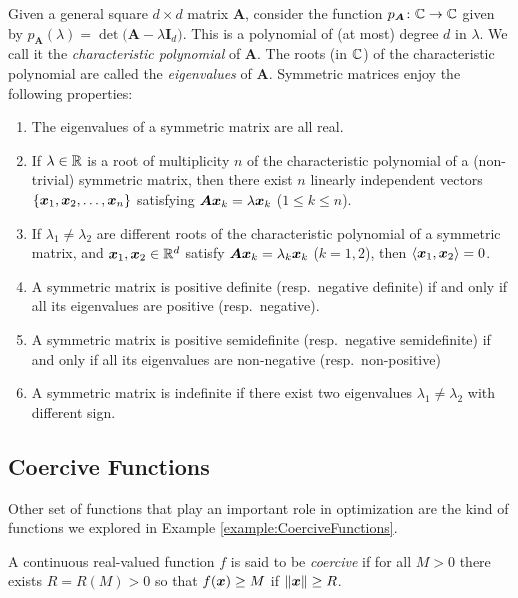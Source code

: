 \begin{theorem}\label{theorem:eigenvalues}
Given a general square $d \times d$ matrix $\boldsymbol{A}$, consider the function $p_{\boldsymbol{A}} \colon \mathbb{C} \to \mathbb{C}$ given by $p_{\boldsymbol{A}}(\lambda) = \det\big(\boldsymbol{A} - \lambda \boldsymbol{I}_d \big)$.  This is a polynomial of (at most) degree $d$ in $\lambda$.  We call it the \emph{characteristic polynomial} of $\boldsymbol{A}$.  The roots (in $\mathbb{C}$) of the characteristic polynomial are called the \emph{eigenvalues} of $\boldsymbol{A}$.  Symmetric matrices enjoy the following properties:
\begin{enumerate}
	\item The eigenvalues of a symmetric matrix are all real.
	\item If $\lambda \in \mathbb{R}$ is a root  of multiplicity $n$ of the characteristic polynomial of a (non-trivial) symmetric matrix, then there exist $n$ linearly independent vectors $\{ \boldsymbol{x}_1, \boldsymbol{x}_2, \dotsc, \boldsymbol{x}_n \}$ satisfying $\boldsymbol{A} \boldsymbol{x}_k = \lambda \boldsymbol{x}_k$ ($1\leq k \leq n$).
	\item If $\lambda_1 \neq \lambda_2$ are different roots of the characteristic polynomial of a symmetric matrix, and $\boldsymbol{x}_1, \boldsymbol{x}_2 \in \mathbb{R}^d$ satisfy $\boldsymbol{A} \boldsymbol{x}_k = \lambda_k \boldsymbol{x}_k$ ($k=1,2$), then $\langle \boldsymbol{x}_1, \boldsymbol{x}_2 \rangle = 0$.
	\item A symmetric matrix is positive definite (resp.~negative definite) if and only if all its eigenvalues are positive (resp.~negative).
	\item A symmetric matrix is positive semidefinite (resp.~negative semidefinite) if and only if all its eigenvalues are non-negative (resp.~non-positive)
	\item A symmetric matrix is indefinite if there exist two eigenvalues $\lambda_1 \neq \lambda_2$ with different sign.
\end{enumerate}
\end{theorem}

\subsection{Coercive Functions}
Other set of functions that play an important role in optimization are the kind of functions we explored in Example \ref{example:CoerciveFunctions}.

\begin{definition}\label{def:coerciveFunctions}
A continuous real-valued function $f$ is said to be \emph{coercive} if for all $M>0$ there exists $R=R(M)>0$ so that $f(\boldsymbol{x})\geq M$ if $\lVert \boldsymbol{x} \rVert\geq R$.
\end{definition}


